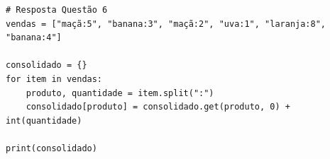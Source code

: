 \ifmostrarGabarito
\begin{verbatim}
# Resposta Questão 6
vendas = ["maçã:5", "banana:3", "maçã:2", "uva:1", "laranja:8", "banana:4"]

consolidado = {}
for item in vendas:
    produto, quantidade = item.split(":")
    consolidado[produto] = consolidado.get(produto, 0) + int(quantidade)

print(consolidado)
\end{verbatim}
\fi
